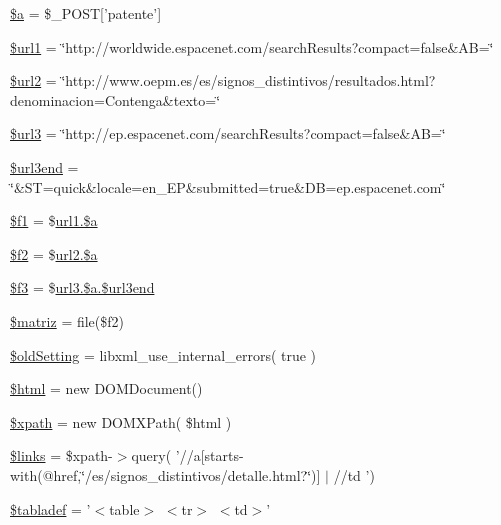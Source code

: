 \begin{DoxyCompactItemize}
\item 
\hyperlink{accion_8php_acebf83966ef6d7e5645a6b62ba368f9f}{\$a} = \$\-\_\-\-P\-O\-S\-T\mbox{[}'patente'\mbox{]}
\item 
\hyperlink{accion_8php_a6b780572d403730c4f958bfff1a7a7c4}{\$url1} = \char`\"{}http\-://worldwide.\-espacenet.\-com/search\-Results?compact=false\&A\-B=\char`\"{}
\item 
\hyperlink{accion_8php_a22d7d56cce8f1edfe80520f5ecd53299}{\$url2} = \char`\"{}http\-://www.\-oepm.\-es/es/signos\-\_\-distintivos/resultados.\-html?denominacion=Contenga\&texto=\char`\"{}
\item 
\hyperlink{accion_8php_adc558598df5e4c075fae9e30c8825716}{\$url3} = \char`\"{}http\-://ep.\-espacenet.\-com/search\-Results?compact=false\&A\-B=\char`\"{}
\item 
\hyperlink{accion_8php_a55166030a9a63cf5f84e1fbf035e4857}{\$url3end} = \char`\"{}\&S\-T=quick\&locale=en\-\_\-\-E\-P\&submitted=true\&D\-B=ep.\-espacenet.\-com\char`\"{}
\item 
\hyperlink{accion_8php_a8f4c2e985a8fcfe3137f3758fd0bddeb}{\$f1} = \$\hyperlink{accion_8php_acebf83966ef6d7e5645a6b62ba368f9f}{url1.\$a}
\item 
\hyperlink{accion_8php_a700a13b72fad231fc3fa2c45597a5615}{\$f2} = \$\hyperlink{accion_8php_acebf83966ef6d7e5645a6b62ba368f9f}{url2.\$a}
\item 
\hyperlink{accion_8php_acbfa0f89ab3a6c40073dcc48aff0e97d}{\$f3} = \$\hyperlink{accion_8php_a55166030a9a63cf5f84e1fbf035e4857}{url3.\$a.\$url3end}
\item 
\hyperlink{accion_8php_ab3085040f9b0692adea148136827b8ed}{\$matriz} = file(\$f2)
\item 
\hyperlink{accion_8php_afac1cf670bb0027604bf30d392e071a8}{\$old\-Setting} = libxml\-\_\-use\-\_\-internal\-\_\-errors( true )
\item 
\hyperlink{accion_8php_a6f96e7fc92441776c9d1cd3386663b40}{\$html} = new D\-O\-M\-Document()
\item 
\hyperlink{accion_8php_aa270f2ef637ad3d6465f2b764c046def}{\$xpath} = new D\-O\-M\-X\-Path( \$html )
\item 
\hyperlink{accion_8php_a4ca8be3ff3cf95aa3af546449c1f1bec}{\$links} = \$xpath-\/$>$query( '//a\mbox{[}starts-\/with(@href,\char`\"{}/es/signos\-\_\-distintivos/detalle.\-html?\char`\"{})\mbox{]} $|$ //td ')
\item 
\hyperlink{accion_8php_aae64521d5d68e0fcfc9ffcef5576546f}{\$tabladef} = '$<$table$>$ $<$tr$>$ $<$td$>$'

\end{DoxyCompactItemize}
